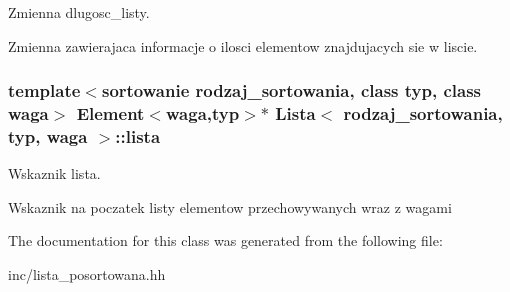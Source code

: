 Zmienna dlugosc\+\_\+listy. 

Zmienna zawierajaca informacje o ilosci elementow znajdujacych sie w liscie. \hypertarget{class_lista_a963befb27122366658c40d670488e6af}{
\subsubsection[{lista}]{\setlength{\rightskip}{0pt plus 5cm}template$<$sortowanie rodzaj\+\_\+sortowania, class typ, class waga$>$ {\bf Element}$<$waga,typ$>$$\ast$ {\bf Lista}$<$ rodzaj\+\_\+sortowania, typ, waga $>$\+::lista\hspace{0.3cm}{\ttfamily [private]}}}\label{class_lista_a963befb27122366658c40d670488e6af}


Wskaznik lista. 

Wskaznik na poczatek listy elementow przechowywanych wraz z wagami 

The documentation for this class was generated from the following file\+:\begin{DoxyCompactItemize}
\item 
inc/lista\+\_\+posortowana.\+hh\end{DoxyCompactItemize}
